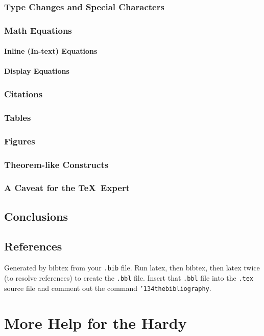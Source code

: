 \subsubsection{Type Changes and  Special Characters}
\subsubsection{Math Equations}
\paragraph{Inline (In-text) Equations}
\paragraph{Display Equations}
\subsubsection{Citations}
\subsubsection{Tables}
\subsubsection{Figures}
\subsubsection{Theorem-like Constructs}
\subsubsection*{A Caveat for the \TeX\ Expert}
\subsection{Conclusions}
\subsection{References}
Generated by bibtex from your \texttt{.bib} file.  Run latex,
then bibtex, then latex twice (to resolve references)
to create the \texttt{.bbl} file.  Insert that \texttt{.bbl}
file into the \texttt{.tex} source file and comment out
the command \texttt{{\char'134}thebibliography}.
\section{More Help for the Hardy}

